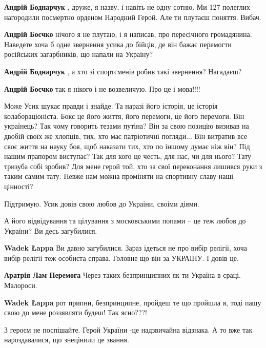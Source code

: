 \begin{itemize}
\begin{itemize} %
\textbf{Андрій Боднарчук} , друже, я назву, і навіть не одну сотню. Ми 127 полеглих нагородили посмертно орденом Народний Герой. Але ти плутаєш поняття. Вибач.

\textbf{Андрій Боєчко} нічого я не плутаю, і я написав, про пересічного громадянина. Наведете хоча б одне звернення усика до бійців, де він бажає перемогти російських загарбників, що напали на Україну?


\textbf{Андрій Боднарчук} , а хто зі спортсменів робив такі звернення? Нагадаєш?

\textbf{Андрій Боєчко} так я нікого і не возвеличую. Про це і мова!!!!
\end{itemize} %


Може Усик шукає правди і знайде. Та наразі його історія, це історія
колабораціоніста. Бокс це його життя, його перемоги, це його перемоги. Він
українець? Так чому говорить тезами путіна? Він за свою позицію визивав на
двобій своїх же хлопців, тих, хто має патріотичні погляди... Він витратив все
своє життя на науку боя, щоб наказати тих, хто по іншому думає ніж він? Під
нашим прапором виступає? Так для кого це честь, для нас, чи для нього? Тату
тризуба собі зробив? Для мене герой той, хто за свої переконання лишився руки з
таким самим тату. Невже нам можна проміняти на спортивну славу наші цінності?

Підтримую. Усик довів свою любов до Украіни, своіми діями.

\begin{itemize} %
А його відвідування та цілування з московськими попами – це теж любов до України? Ви десь загубилися.

\textbf{Wadek Łappa}
Ви давно загубилися.
Зараз ідеться не про вибір релігіі, хоча вибір релігіі теж особиста справа. Головне що він за УКРАІНУ. І довів це.

\textbf{Аратрія Лам Перемога} Через таких безпринципних як ти Україна в сраці. Малороси.

\textbf{Wadek Łappa} рот припни, безпринципне, пройдеш те що пройшла я, тоді пащу свою до мене роззявляти будеш! Так ясно???!
\end{itemize} %

З героєм не поспішайте. Герой України -це надзвичайна відзнака. А то вже так нароздавалися, що знецінили це звання.


\end{itemize}
